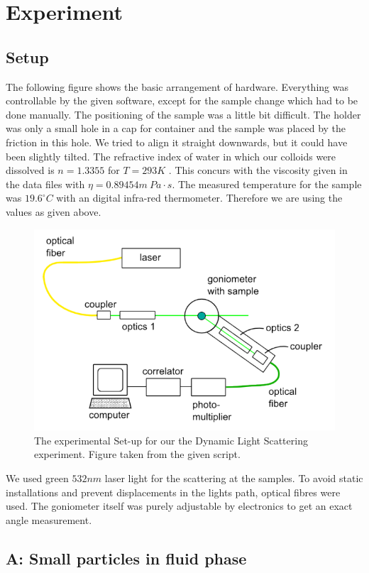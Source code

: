 \documentclass[]{article}
\begin{document}
\newpage
\section{Experiment}
\subsection{Setup}
The following figure shows the basic arrangement of hardware. Everything was controllable by the given software, except for the sample change which had to be done manually. The positioning of the sample was a little bit difficult. The holder was only a small hole in a cap for container and the sample was placed by the friction in this hole. We tried to align it straight downwards, but it could have been slightly tilted. The refractive index of water in which our colloids were dissolved is $n=1.3355$ for $T=293K$ \cite{refrac}. This concurs with the viscosity given in the data files with $\eta = 0.89454m\: Pa\cdot s$. The measured temperature for the sample was $19.6 ^\circ C$ with an digital infra-red thermometer. Therefore we are using the values as given above.

\begin{figure}[!htbp]
\centering
\includegraphics[width=0.8\linewidth]{Plots/Setup.png}
\caption{The experimental Set-up for our the Dynamic Light Scattering experiment. Figure taken from the given script.}
\end{figure}

We used green $532nm$ laser light for the scattering at the samples. To avoid static installations and prevent displacements in the lights path, optical fibres were used. The goniometer itself was purely adjustable by electronics to get an exact angle measurement.


\subsection{A: Small particles in fluid phase}
\end{document}
